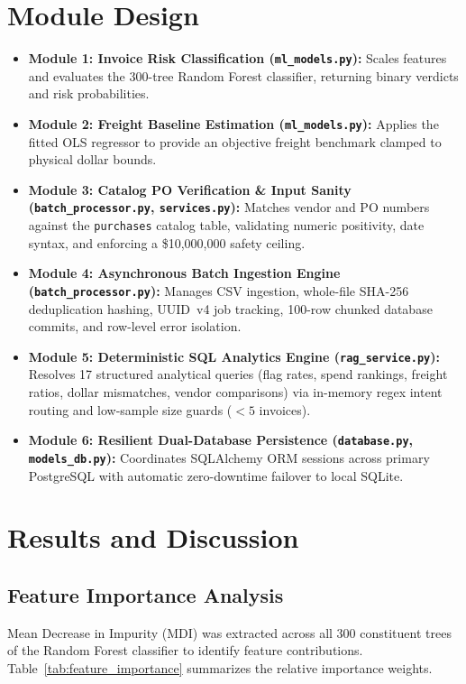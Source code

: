 \documentclass[conference]{IEEEtran}
\begin{document}
\section{Module Design}

\begin{itemize}
    \item \textbf{Module 1: Invoice Risk Classification (\texttt{ml\_models.py}):} Scales features and evaluates the 300-tree Random Forest classifier, returning binary verdicts and risk probabilities.
    \item \textbf{Module 2: Freight Baseline Estimation (\texttt{ml\_models.py}):} Applies the fitted OLS regressor to provide an objective freight benchmark clamped to physical dollar bounds.
    \item \textbf{Module 3: Catalog PO Verification \& Input Sanity (\texttt{batch\_processor.py}, \texttt{services.py}):} Matches vendor and PO numbers against the \texttt{purchases} catalog table, validating numeric positivity, date syntax, and enforcing a \$10,000,000 safety ceiling.
    \item \textbf{Module 4: Asynchronous Batch Ingestion Engine (\texttt{batch\_processor.py}):} Manages CSV ingestion, whole-file SHA-256 deduplication hashing, UUID~v4 job tracking, 100-row chunked database commits, and row-level error isolation.
    \item \textbf{Module 5: Deterministic SQL Analytics Engine (\texttt{rag\_service.py}):} Resolves 17 structured analytical queries (flag rates, spend rankings, freight ratios, dollar mismatches, vendor comparisons) via in-memory regex intent routing and low-sample size guards ($<5$ invoices).
    \item \textbf{Module 6: Resilient Dual-Database Persistence (\texttt{database.py}, \texttt{models\_db.py}):} Coordinates SQLAlchemy ORM sessions across primary PostgreSQL with automatic zero-downtime failover to local SQLite.
\end{itemize}

\section{Results and Discussion}

\subsection{Feature Importance Analysis}
Mean Decrease in Impurity (MDI) was extracted across all 300 constituent trees of the Random Forest classifier to identify feature contributions. Table~\ref{tab:feature_importance} summarizes the relative importance weights.
\end{document}
